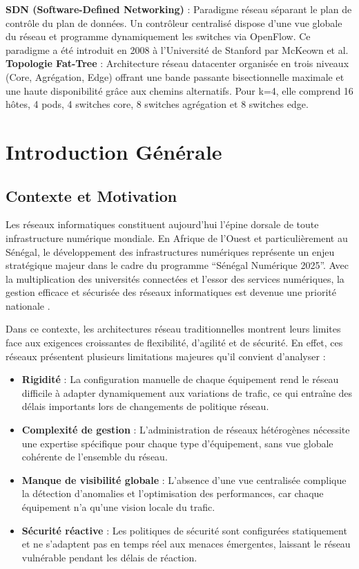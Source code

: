 \documentclass[12pt,a4paper]{report}
\begin{document}
\textbf{SDN (Software-Defined Networking)} : Paradigme
réseau séparant le plan de contrôle du plan de données.
Un contrôleur centralisé dispose d'une vue globale du
réseau et programme dynamiquement les switches via
OpenFlow. Ce paradigme a été introduit en 2008 à
l'Université de Stanford par McKeown et al.\\[0.3cm]

\textbf{Topologie Fat-Tree} : Architecture réseau
datacenter organisée en trois niveaux (Core, Agrégation,
Edge) offrant une bande passante bisectionnelle maximale
et une haute disponibilité grâce aux chemins alternatifs.
Pour k=4, elle comprend 16 hôtes, 4 pods, 4 switches
core, 8 switches agrégation et 8 switches edge.
\newpage

\chapter{Introduction Générale}

\section{Contexte et Motivation}

Les réseaux informatiques constituent aujourd'hui l'épine
dorsale de toute infrastructure numérique mondiale. En
Afrique de l'Ouest et particulièrement au Sénégal, le
développement des infrastructures numériques représente
un enjeu stratégique majeur dans le cadre du programme
``Sénégal Numérique 2025''. Avec la multiplication des
universités connectées et l'essor des services numériques,
la gestion efficace et sécurisée des réseaux informatiques
est devenue une priorité nationale \cite{ndiaye2022sdn}.

Dans ce contexte, les architectures réseau traditionnelles
montrent leurs limites face aux exigences croissantes de
flexibilité, d'agilité et de sécurité. En effet, ces
réseaux présentent plusieurs limitations majeures qu'il
convient d'analyser :

\begin{itemize}
    \item \textbf{Rigidité} : La configuration manuelle
    de chaque équipement rend le réseau difficile à
    adapter dynamiquement aux variations de trafic, ce
    qui entraîne des délais importants lors de changements
    de politique réseau.
    \item \textbf{Complexité de gestion} : L'administration
    de réseaux hétérogènes nécessite une expertise
    spécifique pour chaque type d'équipement, sans vue
    globale cohérente de l'ensemble du réseau.
    \item \textbf{Manque de visibilité globale} : L'absence
    d'une vue centralisée complique la détection d'anomalies
    et l'optimisation des performances, car chaque
    équipement n'a qu'une vision locale du trafic.
    \item \textbf{Sécurité réactive} : Les politiques de
    sécurité sont configurées statiquement et ne s'adaptent
    pas en temps réel aux menaces émergentes, laissant le
    réseau vulnérable pendant les délais de réaction.
\end{itemize}
\end{document}
